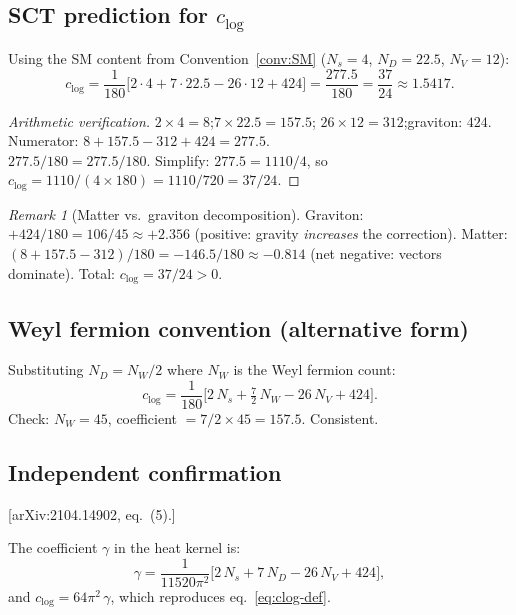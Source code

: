 \documentclass[12pt,a4paper]{article}
\theoremstyle{definition}
\theoremstyle{remark}
\newtheorem{remark}[proposition]{Remark}
\newcommand{\fromlit}[1]{\textcolor{blue!70!black}{\textsf{[#1]}}}
\begin{document}
\subsection{SCT prediction for $c_{\log}$}

Using the SM content from Convention~\ref{conv:SM}
($N_s = 4$, $N_D = 22.5$, $N_V = 12$):
\begin{equation}\label{eq:clog-sct}
  \boxed{
  c_{\log} = \frac{1}{180}\bigl[
    2 \cdot 4 + 7 \cdot 22.5 - 26 \cdot 12 + 424
  \bigr]
  = \frac{277.5}{180}
  = \frac{37}{24}
  \approx 1.5417.}
\end{equation}

\begin{proof}[Arithmetic verification]
$2 \times 4 = 8$;\quad $7 \times 22.5 = 157.5$;\quad
$26 \times 12 = 312$;\quad graviton: $424$.\\
Numerator: $8 + 157.5 - 312 + 424 = 277.5$.\\
$277.5/180 = 277.5/180$.
Simplify: $277.5 = 1110/4$, so $c_{\log} = 1110/(4 \times 180)
= 1110/720 = 37/24$.
\end{proof}

\begin{remark}[Matter vs.\ graviton decomposition]
Graviton: $+424/180 = 106/45 \approx +2.356$ (positive: gravity
\emph{increases} the correction).
Matter: $(8 + 157.5 - 312)/180 = -146.5/180 \approx -0.814$
(net negative: vectors dominate).
Total: $c_{\log} = 37/24 > 0$.
\end{remark}

\subsection{Weyl fermion convention (alternative form)}

Substituting $N_D = N_W/2$ where $N_W$ is the Weyl fermion count:
\begin{equation}\label{eq:sen-weyl}
  c_{\log} = \frac{1}{180}\bigl[
    2\,N_s + \tfrac{7}{2}\,N_W - 26\,N_V + 424
  \bigr].
\end{equation}
Check: $N_W = 45$, coefficient $= 7/2 \times 45 = 157.5$. Consistent.

\subsection{Independent confirmation}
\fromlit{arXiv:2104.14902, eq.~(5).}

The coefficient $\gamma$ in the heat kernel is:
\begin{equation}
  \gamma = \frac{1}{11520\pi^2}\bigl[
    2\,N_s + 7\,N_D - 26\,N_V + 424
  \bigr],
\end{equation}
and $c_{\log} = 64\pi^2\,\gamma$, which reproduces
eq.~\eqref{eq:clog-def}.
\end{document}
